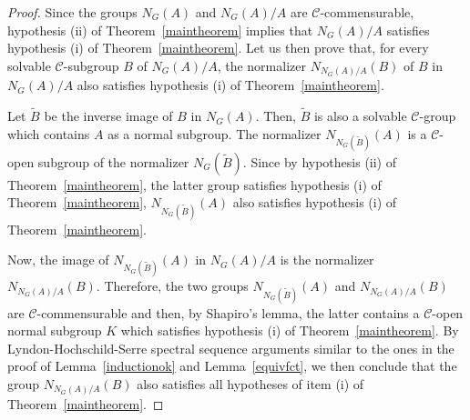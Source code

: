 \documentclass[12pt,twoside]{amsart}
\newcommand\cC{{\mathscr C}}
\newcommand\td{\tilde}
\theoremstyle{definition}
\begin{document}
\begin{proof}Since the groups $N_{G}(A)$ and $N_{G}(A)/A$ are $\cC$-commensurable,
hypothesis (ii) of Theorem~\ref{maintheorem} implies that $N_{G}(A)/A$ satisfies hypothesis (i) of Theorem~\ref{maintheorem}.
Let us then prove that, for every solvable $\cC$-subgroup $B$ of $N_{G}(A)/A$, the normalizer $N_{N_{G}(A)/A}(B)$ of $B$ in $N_{G}(A)/A$ 
also satisfies hypothesis (i) of Theorem~\ref{maintheorem}.

Let $\td{B}$ be the inverse image of $B$ in $N_{G}(A)$. Then, $\td{B}$ is also a solvable $\cC$-group which contains $A$ as a normal subgroup.
The normalizer $N_{N_{G}(\td{B})}(A)$ is a $\cC$-open subgroup of the normalizer $N_{G}(\td{B})$. Since by hypothesis (ii) of 
Theorem~\ref{maintheorem}, the latter group satisfies hypothesis (i) of Theorem~\ref{maintheorem}, $N_{N_{G}(\td{B})}(A)$
also satisfies hypothesis (i) of Theorem~\ref{maintheorem}.

Now, the image of $N_{N_{G}(\td{B})}(A)$ in $N_{G}(A)/A$ is the normalizer $N_{N_{G}(A)/A}(B)$.
Therefore, the two groups $N_{N_{G}(\td{B})}(A)$ and $N_{N_{G}(A)/A}(B)$ are $\cC$-commensurable and then, by Shapiro's lemma, 
the latter contains a $\cC$-open normal subgroup $K$ which satisfies hypothesis (i) of Theorem~\ref{maintheorem}. 
By Lyndon-Hochschild-Serre spectral sequence arguments similar to the ones in the proof of Lemma~\ref{inductionok} and Lemma~\ref{equivfct}, 
we then conclude that the group $N_{N_{G}(A)/A}(B)$ also satisfies all hypotheses of item (i) of Theorem~\ref{maintheorem}.
\end{proof}
\end{document}
